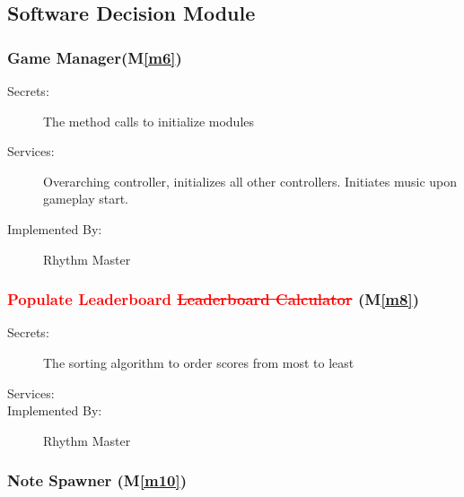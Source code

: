 \documentclass[12pt, titlepage]{article}
\newcommand{\mref}[1]{M\ref{#1}}
\begin{document}
\subsection{Software Decision Module}


\subsubsection{Game Manager(\mref{m6})}

\begin{description}
\item[Secrets:]The method calls to initialize modules
\item[Services:] Overarching controller, initializes all other controllers. Initiates music upon gameplay start.
\item[Implemented By:] Rhythm Master
\end{description}

\subsubsection{\textcolor{red}{Populate Leaderboard} \textcolor{red}{\sout{Leaderboard Calculator}}  (\mref{m8})}

\begin{description}
\item[Secrets:]The sorting algorithm to order scores from most to least
\item[Services:]
\item[Implemented By:] Rhythm Master
\end{description}

\subsubsection{Note Spawner (\mref{m10})}
\end{document}
